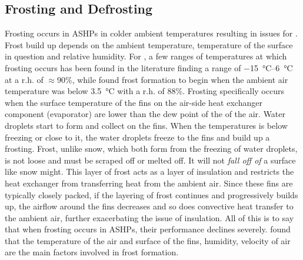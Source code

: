 \subsection{Frosting and Defrosting} \label{subsec:defrost}
Frosting occurs in \acp{ASHP} in colder ambient temperatures resulting in issues for \HPs. Frost build up depends on the ambient temperature, temperature of the surface in question and relative humidity. For \HPs, a few ranges of temperatures at which frosting occurs has been found in the literature \citeauthor{sandstrom_frosting_2021} \cite{sandstrom_frosting_2021} finding a range of \qtyrange{-15}{6}{\celsius} at a r.h. of $\approx$90\%, while \citeauthor{kropas_experimental_2021} \cite{kropas_experimental_2021} found frost formation to begin when the ambient air temperature was below \SI{3.5}{\celsius} with a r.h. of 88\%. Frosting specifically occurs when the surface temperature of the fins on the air-side heat exchanger component (evaporator) are lower than the dew point of the of the air. Water droplets start to form and collect on the fins. When the temperatures is below freezing or close to it, the water droplets freeze to the fins and build up a frosting. Frost, unlike snow, which both form from the freezing of water droplets, is not loose and must be scraped off or melted off. It will not \textit{fall off of} a surface like snow might. This layer of frost acts as a layer of insulation and restricts the heat exchanger from transferring heat from the ambient air. Since these fins are typically closely packed, if the layering of frost continues and progressively builds up, the airflow around the fins decreases and so does convective heat transfer to the ambient air, further exacerbating the issue of insulation. All of this is to say that when frosting occurs in \acp{ASHP}, their performance declines severely. \citeauthor{zhang_experimental_2018} \cite{zhang_experimental_2018} found that the temperature of the air and surface of the fins, humidity, velocity of air are the main factors involved in frost formation. 

